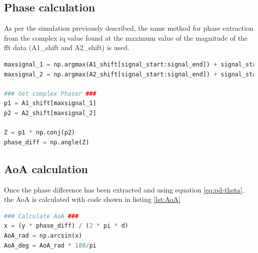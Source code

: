 \documentclass[class=report,11pt,crop=false]{standalone}
\begin{document}
\subsection{Phase calculation}\label{sec:Design/phasecalc}
As per the simulation previously described, the same method for phase extraction from the complex \gls{iq} value found at the maximum value of the magnitude of the \gls{fft} data (A1\_shift and A2\_shift) is used. 

\begin{lstlisting}[language={Python}, caption={Extraction of phase from complex arrays from each \gls{rx} antenna}, label={lst:phase}]
maxsignal_1 = np.argmax(A1_shift[signal_start:signal_end]) + signal_start
maxsignal_2 = np.argmax(A2_shift[signal_start:signal_end]) + signal_start

### Get complex Phasor ###
p1 = A1_shift[maxsignal_1]
p2 = A2_shift[maxsignal_2]

Z = p1 * np.conj(p2)
phase_diff = np.angle(Z)
\end{lstlisting}

\subsection{AoA calculation}
Once the phase difference has been extracted and using equation \ref{eq:pd-theta}, the \gls{AoA} is calculated with code shown in listing \ref{lst:AoA}

\begin{lstlisting}[language={Python}, caption={\gls{AoA} calcualtion using the phase difference between signals \gls{rx} }, label={lst:AoA}]
### Calculate AoA ###
x = (y * phase_diff) / (2 * pi * d)
AoA_rad = np.arcsin(x)
AoA_deg = AoA_rad * 180/pi 
\end{lstlisting}


\end{document}
